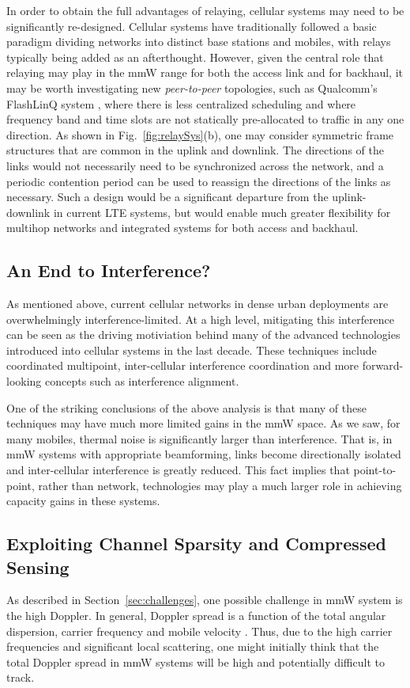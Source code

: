 \documentclass[journal]{IEEEtran}
\begin{document}
In order to obtain the full advantages of relaying, cellular systems may need
to be significantly re-designed.
Cellular systems have traditionally followed a basic paradigm dividing
networks into distinct base stations and mobiles,
with relays typically being added as an afterthought.
However, given the central role that relaying may play in the mmW range for both the access link and for backhaul,
it may be worth investigating new \emph{peer-to-peer} topologies,
such as Qualcomm's FlashLinQ system \cite{FlashLinq:10-allerton},
where there is less centralized scheduling and where
frequency band and time slots
are not statically pre-allocated to traffic in any one direction.
As shown in Fig.~\ref{fig:relaySys}(b), one may consider symmetric frame structures
that are common in the uplink and downlink.  The directions of the links would not
necessarily need to be synchronized across the network, and a periodic
contention period can be used to reassign the directions of the links as necessary.
Such a design would be a significant departure from the uplink-downlink
in current LTE systems, but would enable much greater flexibility for multihop
networks and integrated systems for both access and backhaul.

\subsection{An End to Interference?}
As mentioned above, current cellular networks in dense urban deployments
are overwhelmingly interference-limited.  At a high level, mitigating this interference
can be seen as the driving motiviation behind many of the advanced technologies
introduced into cellular systems in the last decade.  These techniques
include coordinated
multipoint, inter-cellular interference coordination and more forward-looking concepts
such as interference alignment.

One of the striking conclusions of the above analysis is that many of these techniques
may have much more limited gains in the mmW space.  As we saw, for many mobiles,
thermal noise is significantly larger than interference.  That is, in mmW systems
with appropriate beamforming, links become directionally isolated and inter-cellular
interference is greatly reduced.  This fact implies that point-to-point, rather
than network, technologies may play a much larger role in achieving capacity gains
in these systems.

\subsection{Exploiting Channel Sparsity and Compressed Sensing} \label{sec:compSens}
As described in Section~\ref{sec:challenges}, one possible challenge in mmW
system is the high Doppler.  In general, Doppler spread is a function of the total
angular dispersion, carrier frequency and mobile velocity \cite{Rappaport:02}.
Thus, due to the high carrier frequencies and significant local scattering,
one might initially think that the total
Doppler spread in mmW systems will be high and potentially difficult to track.
\end{document}
